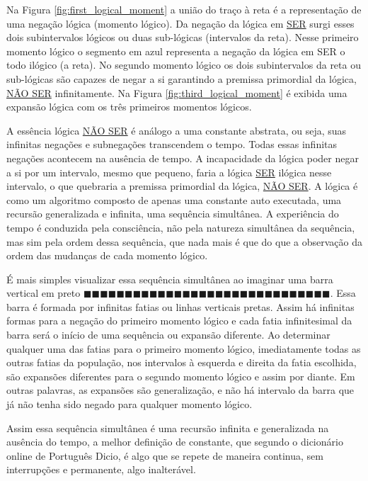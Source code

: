 Na Figura \ref{fig:first_logical_moment} a união do traço à reta é a representação de uma negação lógica (momento lógico). Da negação da lógica em \underline{SER} surgi esses dois subintervalos lógicos ou duas sub-lógicas (intervalos da reta). Nesse primeiro momento lógico o segmento em azul representa a negação da lógica em SER o todo ilógico (a reta). No segundo momento lógico os dois subintervalos da reta ou sub-lógicas são capazes de negar a si garantindo a premissa primordial da lógica, \underline{NÃO SER} infinitamente. Na Figura \ref{fig:third_logical_moment} é exibida uma expansão lógica com os três primeiros momentos lógicos.

A essência lógica \underline{NÃO SER} é análogo a uma constante abstrata, ou seja, suas infinitas negações e subnegações transcendem o tempo. Todas essas infinitas negações acontecem na ausência de tempo. A incapacidade da lógica poder negar a si por um intervalo, mesmo que pequeno, faria a lógica \underline{SER} ilógica nesse intervalo, o que quebraria a premissa primordial da lógica, \underline{NÃO SER}. A lógica é como um algoritmo composto de apenas uma constante auto executada, uma recursão generalizada e infinita, uma sequência simultânea. A experiência do tempo é conduzida pela consciência, não pela natureza simultânea da sequência, mas sim pela ordem dessa sequência, que nada mais é que do que a observação da ordem das mudanças de cada momento lógico.

É mais simples visualizar essa sequência simultânea ao imaginar uma barra vertical em preto $\!\blacksquare\!\blacksquare\!\blacksquare\!\blacksquare\!\blacksquare\!\blacksquare\!\blacksquare\!\blacksquare\!\blacksquare\!\blacksquare\!\blacksquare\!\blacksquare\!\blacksquare\!\blacksquare\!\blacksquare\!\blacksquare\!\blacksquare\!\blacksquare\!\blacksquare\!\blacksquare\!\blacksquare\!\blacksquare\!\blacksquare\!\blacksquare\!\blacksquare\!\blacksquare\!\blacksquare\!\blacksquare\!\blacksquare\!\blacksquare$. Essa barra é formada por infinitas fatias ou linhas verticais pretas. Assim há infinitas formas para a negação do primeiro momento lógico e cada fatia infinitesimal da barra será o início de uma sequência ou expansão diferente. Ao determinar qualquer uma das fatias para o primeiro momento lógico, imediatamente todas as outras fatias da população, nos intervalos à esquerda e direita da fatia escolhida, são expansões diferentes para o segundo momento lógico e assim por diante. Em outras palavras, as expansões são generalização, e não há intervalo da barra que já não tenha sido negado para qualquer momento lógico. 

Assim essa sequência simultânea é uma recursão infinita e generalizada na ausência do tempo, a melhor definição de constante, que segundo o dicionário online de Português Dicio\cite{dicio_constante}, é algo que se repete de maneira continua, sem interrupções e permanente, algo inalterável.







